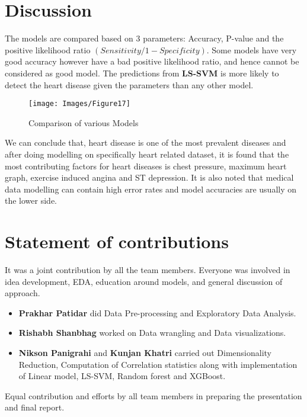 \documentclass[11pt]{article}
\begin{document}
\begin{multicols}{2}
    \section{Discussion}
    The models are compared based on 3 parameters: Accuracy, P-value and the positive likelihood ratio $(Sensitivity/1 - Specificity)$. Some models have very good accuracy however have a bad positive likelihood ratio, and hence cannot be considered as good model. The predictions from \textbf{LS-SVM} is more likely to detect the heart disease given the parameters than any other model.
    \begin{figure}[H]
        \centering
        \texttt{[image: Images/Figure17]}
        \vspace{-5pt}
        \caption{Comparison of various Models}
    \end{figure} 
    We can conclude that, heart disease is one of the most prevalent diseases and after doing modelling on specifically heart related dataset, it is found that the most contributing factors for heart diseases is chest pressure, maximum heart graph, exercise induced angina and ST depression. It is also noted that medical data modelling can contain high error rates and model accuracies are usually on the lower side. 
    
    \section{Statement of contributions}
    It was a joint contribution by all the team members. Everyone was involved in idea development, EDA, education around models, and general discussion of approach. 
    \begin{itemize}
        \item \textbf{Prakhar Patidar} did Data Pre-processing and Exploratory Data Analysis.
        \item \textbf{Rishabh Shanbhag} worked on Data wrangling and Data visualizations.
        \item \textbf{Nikson Panigrahi} and \textbf{Kunjan Khatri} carried out Dimensionality Reduction, Computation of Correlation statistics along with implementation of Linear model, LS-SVM, Random forest and XGBoost.
    \end{itemize}   Equal contribution and efforts by all team members in preparing the presentation and final report. 


\end{multicols}
\end{document}
